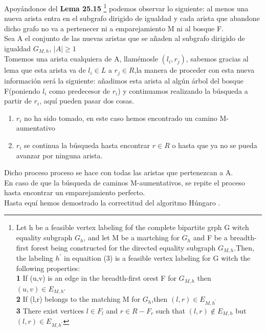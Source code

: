 \documentclass[sn-mathphys,Numbered]{sn-jnl}%
\theoremstyle{thmstyleone}%
\theoremstyle{thmstyletwo}%
\theoremstyle{thmstylethree}%
\begin{document}
\begin{enumerate}
    Apoy\'andonos del \textbf{Lema 25.15} \cite{5}\footnote{ Let h be a feasible vertex labeling fof the complete bipartite grph G witch equality subgraph $G_h$, and let M be a martching for $G_h$ and F be a breadth-first forest being constructed for the directed equality subgraph $G_{M,h}$.Then, the labeling $h^{'}$ in equaition (3) is a feasible vertex labeling for G witch the following properties:\\
        \textbf{1} If (u,v) is an edge in the breadth-first orest F for $G_{M,h}$ then $(u,v) \in E_{M,h^{}'}$\\
        \textbf{2} If (l,r) belongs to the matching M for $G_{h}$,then $(l,r) \in E_{M,h^{'}}$\\
        \textbf{3} There exist vertices $l \in F_l$ and $r \in R - F_r$ such that $(l,r) \notin E_{M,h}$ but $(l,r) \in E_{M,h^{'}}$ 
    }
    podemos observar lo siguiente: al menos una nueva arista entra en el subgrafo dirigido de igualdad y cada arista que abandone dicho grafo no va a pertenecer ni a emparejamiento M ni al bosque F.\\
    Sea A el conjunto de las nuevas aristas que se a\~naden al subgrafo dirigido de igualdad $G_{M,h}$, $|A|\geq 1$\\
    Tomemos una arista cualquiera de A, llamémosle $(l_i,r_j)$, sabemos gracias al lema que esta arista va de $l_i \in L$ a $r_j\in R$,la manera de proceder con esta nueva informaci\'on ser\'a la siguiente: a\~nadimos esta arista al alg\'un \'arbol del bosque F(poniendo $l_i$ como predecesor de $r_i$) y continuamos realizando la búsqueda a partir de $r_i$, aqu\'i pueden pasar dos cosas.
    \begin{enumerate}
        \item $r_i$ no ha sido tomado, en este caso hemos encontrado un camino M-aumentativo
        \item $r_i$ se continua la búsqueda hasta encontrar $r\in R$ o hasta que ya no se pueda avanzar por ninguna arista.
    \end{enumerate}
    Dicho proceso proceso se hace con todas las aristas que pertenezcan a A.\\
    En caso de que la búsqueda de caminos M-aumentativos, se repite el proceso hasta encontrar un emparejamiento perfecto.\\
    Hasta equ\'i hemos demostrado la correctitud del algoritmo Húngaro . 
\end{enumerate}
\end{document}
